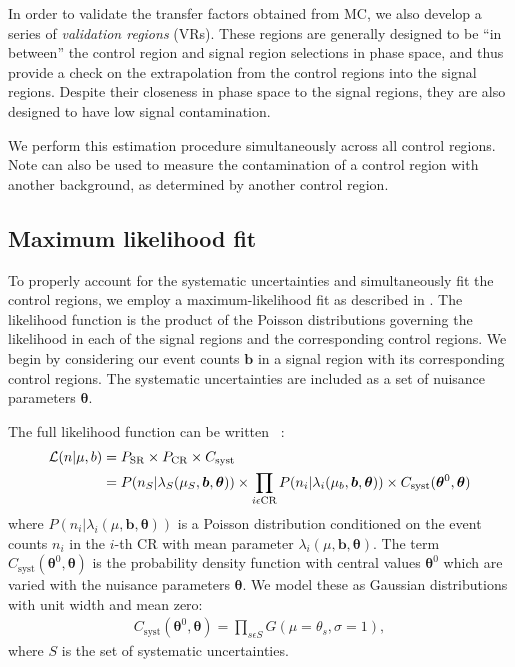 In order to validate the transfer factors obtained from MC, we also develop a series of \textit{validation regions} (VRs).
These regions are generally designed to be ``in between'' the control region and signal region selections in phase space, and thus provide a check on the extrapolation from the control regions into the signal regions.
Despite their closeness in phase space to the signal regions, they are also designed to have low signal contamination.

We perform this estimation procedure simultaneously across all control regions.
Note  can also be used to measure the contamination of a control region with another background, as determined by another control region.

\subsection{Maximum likelihood fit}

To properly account for the systematic uncertainties and simultaneously fit the control regions, we employ a maximum-likelihood fit as described in \cite{Baak:2014wma}.
The likelihood function \Lagr is the product of the Poisson distributions governing the likelihood in each of the signal regions and the corresponding control regions.
We begin by considering our event counts  $\bm{b}$ in a signal region with its corresponding control regions.
The systematic uncertainties are included as a set of nuisance parameters $\bm{\theta}$.

The full likelihood function can be written ~\cite{Baak:2014wma}:
\begin{align}
\mathcal{L}(n | \mu, b) &= P_{\mathrm{SR}} \times P_{\mathrm{CR}} \times C_{\mathrm{syst}} \\
                  &= P(n_S | \lambda_S(\mu_{S},  \bm{b}, \bm{\theta} ) ) \times
                     \prod_{i \epsilon \text{CR}}  P(n_i | \lambda_i(\mu_b , \bm{b}, \bm{\theta}))
                     \times C_{\text{syst}}(\bm{\theta}^0 , \bm{\theta})
\end{align}
where $P(n_i | \lambda_i(\mu , \bm{b}, \bm{\theta}))$ is a Poisson distribution conditioned on the event counts $n_i$ in the $i$-th CR with mean parameter $\lambda_i(\mu , \bm{b}, \bm{\theta})$.
The term $C_{\text{syst}}(\bm{\theta}^0 , \bm{\theta})$ is the probability density function with central values $\bm{\theta}^0$ which are varied with the nuisance parameters $\bm{\theta}$.
We model these as Gaussian distributions with unit width and mean zero:
\begin{align}
C_{\text{syst}}(\bm{\theta}^0 , \bm{\theta}) = \prod_{s\epsilon S} G(\mu = \theta_s, \sigma = 1),
\end{align}
where $S$ is the set of systematic uncertainties.

